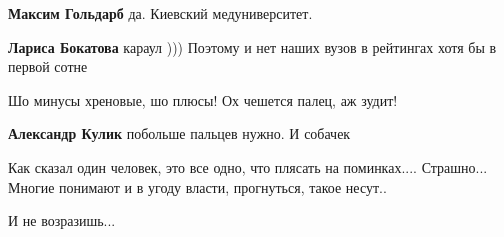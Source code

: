 \begin{itemize}
\begin{itemize}
 
\textbf{Максим Гольдарб} да. Киевский медуниверситет.

 
\textbf{Лариса Бокатова} караул )))
Поэтому и нет наших вузов в рейтингах хотя бы в первой сотне
\end{itemize}

 
Шо минусы хреновые, шо плюсы!
Ох чешется палец, аж зудит!

\begin{itemize}
 
\textbf{Александр Кулик} побольше пальцев нужно. И собачек
\end{itemize}

 
Как сказал один человек, это все одно, что плясать на
поминках.... Страшно... Многие понимают и в угоду власти, прогнуться, такое несут..

 
И не возразишь...


\end{itemize}
